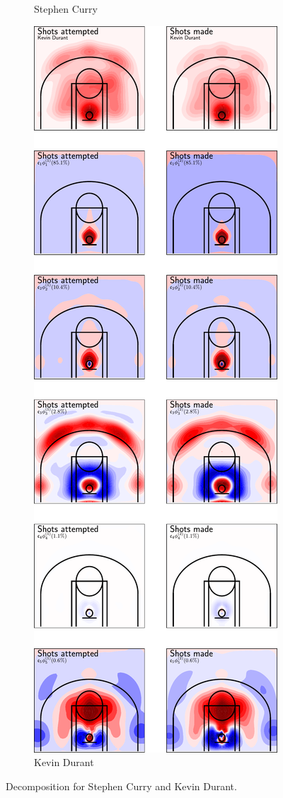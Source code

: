 \begin{figure}
\begin{subfigure}[b]{0.4\textwidth}
        \caption{Stephen Curry}
        \label{fig:curry_decomposition}
    \end{subfigure}
    \hfill
    \begin{subfigure}[b]{0.4\textwidth}
        \centering
        \includegraphics[width=\textwidth]{figures/durant_decomposition.pdf}
        \caption{Kevin Durant}
        \label{fig:durant_decomposition}
    \end{subfigure}
    \caption{Decomposition for Stephen Curry and Kevin Durant.}
    \label{fig:shoots_decomposition}
\end{figure}

